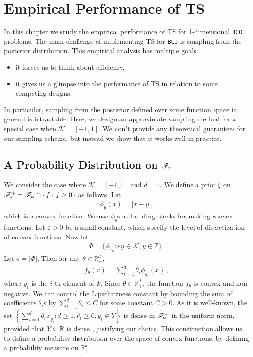\documentclass[letter, 12pt]{report}
\newcommand{\pb}{\text{\tiny\texttt{b}}}
\newcommand{\pl}{\text{\tiny\texttt{l}}}
\newcommand{\R}{\mathbb R}
\newcommand{\abs}[1]{\left| #1 \right|}
\newcommand{\cK}{\mathcal K}
\newcommand{\sF}{\mathscr F}
\newcommand{\1}{\mathbf{1}}
\newcommand{\bco}{\texttt{BCO}\xspace}
\newcommand{\ts}{\textsc{TS}\xspace}
\renewcommand{\epsilon}{\varepsilon}
\theoremstyle{plain}
\theoremstyle{definition}
\theoremstyle{remark}
\begin{document}
\chapter{Empirical Performance of \ts}
In this chapter we study the empirical performance of \ts
for 1-dimensional \bco problems.
The main challenge of implementing \ts
for \bco is sampling from the posterior distribution.
This empirical analysis has multiple goals:
\begin{itemize}
    \item it forces us to think about efficiency,
    \item it gives us a glimpse into the performance of \ts{} in relation to some competing designs.
\end{itemize}
In particular, sampling from the posterior defined over some function space in general is intractable.
Here, we design an approximate sampling method for a special case when $\cK=[-1,1]$.
We don't provide any theoretical guarantees for our sampling
scheme, but instead we show that it works well in practice.

\section{A Probability Distribution on $\sF_{\pb\pl}$}
\label{sec:ts-empirical}
We consider the case where $\cK = [-1, 1]$ and $d = 1$.
We define a prior $\xi$ on $\sF_{\pb\pl}^+=\sF_{\pb\pl} \cap \{f: f\geq0\}$ as follows.
Let
\begin{align*}
    \phi_{y}(x) = \abs{x - y},
\end{align*}
which is a convex function.
We use $\phi_y$s as building blocks for making convex functions.
Let $\epsilon > 0$ be a small constant, which specify the level of discretization of convex functions.
Now let
\begin{align}
    \Phi = \{ \phi_{\epsilon y} : \epsilon y \in \cK, y \in \mathbb{Z}\}\,.
\end{align}
Let $d = |\Phi|$.
Then for any $\theta \in \R_+^d$,
\begin{align*}
    f_\theta(x) = \sum_{i=1}^d \theta_i \phi_{y_i}(x)\,,
\end{align*}
where $y_i$ is the $i$-th element of $\Phi$.
Since $\theta \in \R_+^d$, the function $f_\theta$ is convex and non-negative.
We can control the Lipschitzness constant by bounding the sum of coefficients $\theta_i$s
by $\sum_{i=1}^d \theta_i \leq C$ for some constant $C > 0$.
As it is well-known, the set $\left\{
    \sum_{i=1}^{d} \theta_i \phi_{y_i}: d\geq 1, \theta_i\geq 0, y_i \in Y
    \right\}$
is dense in $\sF_{\pb\pl}^+$ in the uniform norm, provided that $Y\subseteq \R$ is dense \citep{billingsley2013convergence}, justifying our choice.
This construction allows us to define a probability distribution over the space of convex functions,
by defining a probability measure on $\R_+^d$.
\end{document}
